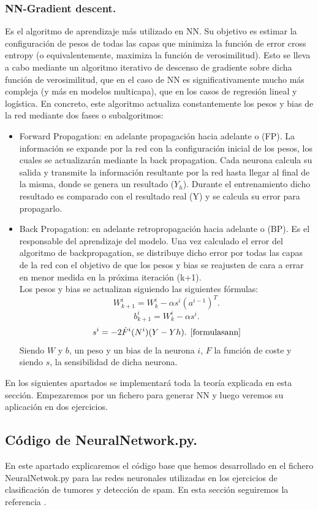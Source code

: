\documentclass[a4paper,11pt]{article}
\begin{document}
\subsubsection{NN-Gradient descent.}
Es el algoritmo de aprendizaje más utilizado en NN. Su objetivo es estimar
la configuración de pesos de todas las capas que minimiza la función de error
cross entropy (o equivalentemente, maximiza la función de verosimilitud). Esto
se lleva a cabo mediante un algoritmo iterativo de descenso de gradiente sobre
dicha función de verosimilitud, que en el caso de NN es significativamente mucho
más compleja (y más en modelos multicapa), que en los casos de regresión lineal
y logística. En concreto, este algoritmo actualiza constantemente los pesos y bias
de la red mediante dos fases o subalgoritmos:

\begin{itemize}
    \item Forward Propagation: en adelante propagación hacia adelante o (FP). La información se expande por la red con la configuración inicial de los pesos, los cuales se actualizarán mediante la back propagation. Cada neurona calcula su salida y transmite la información resultante por la red hasta llegar al final de la misma, donde se genera un resultado ($Y_h$). Durante el entrenamiento dicho resultado es comparado con el resultado real (Y) y se calcula su error para propagarlo.
    \item Back Propagation: en adelante retropropagación hacia adelante o (BP). Es el responsable del aprendizaje del modelo. Una vez calculado el error del algoritmo de backpropagation, se distribuye dicho error por todas las capas de la red con el objetivo de que los pesos y bias se reajusten de cara a errar en menor medida en la próxima iteración (k+1). \\Los pesos y bias se actualizan siguiendo las siguientes fórmulas:
    \[
    W_{k+1}^i  = W_{k}^i  - \alpha s^i (a^{i-1})^T.
    \]
    \[
    b_{k+1}^i = W_{k}^i  - \alpha s^i.
    \]
    \[
    s^i = -2\dot{F}^i(N^i)(Y-Yh). \hspace{0.15cm}\cite{formulasann}
    \]
    Siendo $W$ y $b$, un peso y un bias de la neurona $i$, $F$ la función de coste y siendo $s$, la sensibilidad de dicha neurona.
\end{itemize}
\noindent
En los siguientes apartados se implementará toda la teoría explicada en esta sección. Empezaremos por un fichero para generar NN y luego veremos su aplicación en dos ejercicios.
\subsection{Código de NeuralNetwork.py.}
En este apartado explicaremos el código base que hemos desarrollado en el fichero NeuralNetwok.py para las redes neuronales utilizadas en los ejercicios de clasificación de tumores y detección de spam. En esta sección seguiremos la referencia \cite{redes}.\\
\end{document}
